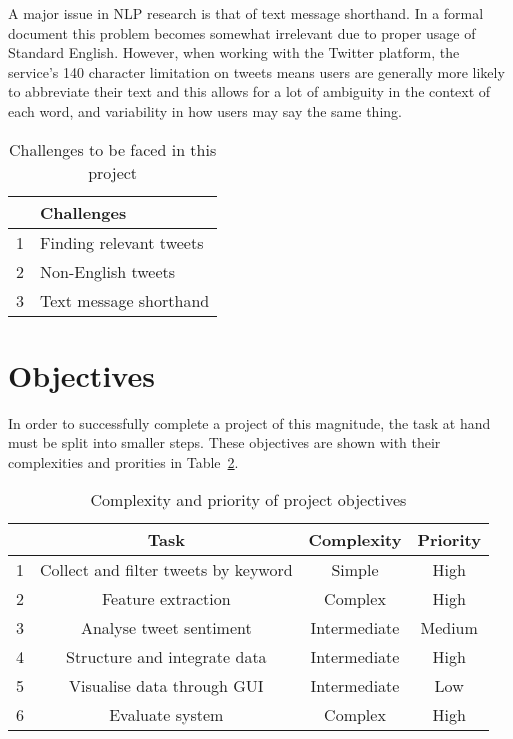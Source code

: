 A major issue in NLP research is that of text message shorthand. In a formal document this problem becomes somewhat irrelevant due to proper usage of Standard English. However, when working with the Twitter platform, the service's 140 character limitation on tweets means users are generally more likely to abbreviate their text and this allows for a lot of ambiguity in the context of each word, and variability in how users may say the same thing.


\begin{table}
\begin{center}
\begin{tabular}{|r|l|}\hline\hline
&Challenges\\\hline
1&Finding relevant tweets\\
2&Non-English tweets\\
3&Text message shorthand\\\hline\hline
\end{tabular}
\end{center}
\caption{Challenges to be faced in this project}\label{challenges}
\end{table}

\section{Objectives}
In order to successfully complete a project of this magnitude, the task at hand must be split into smaller steps.  These objectives are shown with their complexities and prorities in Table~\ref{objectives}.

\begin{table}
\begin{center}
\begin{tabular}{|r|c|c|c|}\hline\hline
&Task&Complexity&Priority\\\hline
1&Collect and filter tweets by keyword&Simple&High\\
2&Feature extraction&Complex&High\\
3&Analyse tweet sentiment&Intermediate&Medium\\
4&Structure and integrate data&Intermediate&High\\
5&Visualise data through GUI&Intermediate&Low\\
6&Evaluate system&Complex&High\\\hline\hline
\end{tabular}
\end{center}
\caption{Complexity and priority of project objectives}\label{objectives}
\end{table}

